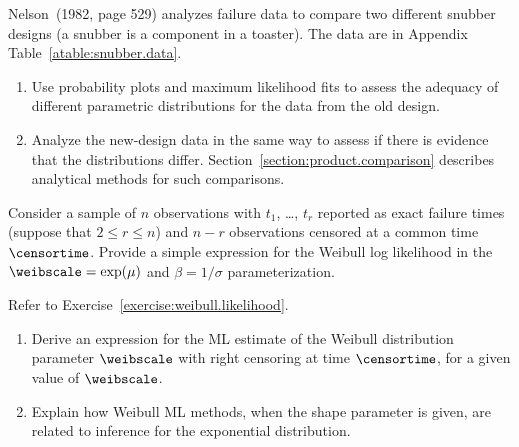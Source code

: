 \begin{exercise}
Nelson~(1982, page 529) analyzes failure data to compare two
different snubber designs (a snubber is a component in a toaster).  The data
are in Appendix Table~\ref{atable:snubber.data}.
\begin{enumerate}
\item  
Use
probability plots and maximum likelihood fits  to assess the
adequacy of different parametric distributions for the data from the
old design.
\item  
Analyze the new-design data in the same way to assess
if there is evidence that the distributions differ.
Section~\ref{section:product.comparison} describes analytical
methods for such comparisons.
\end{enumerate}
\end{exercise}


\begin{exercise}
\label{exercise:weibull.likelihood}
Consider a sample of $n$ observations with 
$t_{1}$, \ldots, $t_{r}$ reported as exact failure times (suppose that
$2 \leq r \leq n$) and $n-r$ observations censored at a common time 
$\censortime$. Provide a simple expression for the Weibull log likelihood 
in the $\weibscale=\exp(\mu)$ and $\beta=1/\sigma$ parameterization.
\end{exercise}

\begin{exercise1}
Refer to Exercise~\ref{exercise:weibull.likelihood}. 
\begin{enumerate}
\item
Derive an expression for the ML estimate of the Weibull distribution
parameter $\weibscale$ with right censoring at time $\censortime$,
for a given value of $\weibscale$.
\item
Explain how Weibull ML methods, when the shape parameter is given,
are related to inference for the exponential distribution.
\end{enumerate}
\end{exercise1}

